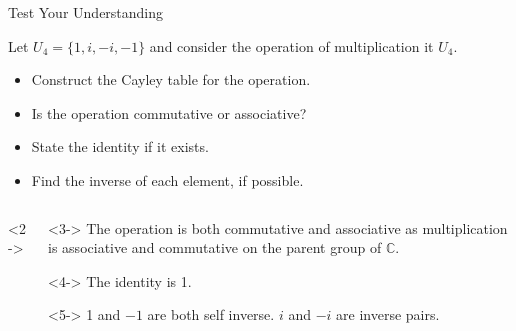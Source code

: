 \documentclass[8pt]{beamer}
\begin{document}
\begin{frame}{Test Your Understanding}
	\begin{problem}
		Let $U_{4}=\{1,i,-i,-1\}$ and consider the operation of multiplication it $ U_4$.
		\begin{itemize}
			\item  Construct the Cayley table for the operation.
			\item Is the operation commutative or associative?
			\item State the identity if it exists.
			\item Find the inverse of each element, if possible.

		\end{itemize}
	\end{problem}
\begin{columns}[T]
	\begin{column}{.6\linewidth}
\begin{solution}<2->
	
		\centering
\end{solution}	
\end{column}
\begin{column}{.4\linewidth}
\begin{solution}<3->
	The operation is both commutative and associative as multiplication is associative and commutative on the parent group of $\mathbb{C}.$
\end{solution}
\begin{solution}<4->
	The identity is 1.
	
\end{solution}
\begin{solution}<5->
	1 and  $-1$ are both self inverse. $i$ and  $-i$ are inverse pairs.
\end{solution}
\end{column}
\end{columns}
\end{frame}
\end{document}
